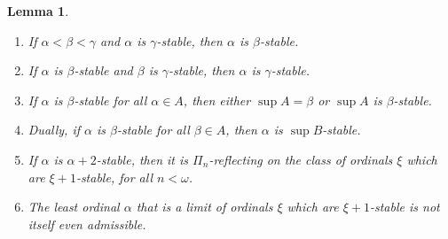 \documentclass{article}
\theoremstyle{definition}
\theoremstyle{plain}
\theoremstyle{plain}
\theoremstyle{plain}
\theoremstyle{plain}
\theoremstyle{remark}
\theoremstyle{remark}
\theoremstyle{remark}
\theoremstyle{plain}
\newtheorem{lemma}[definition]{Lemma}
\theoremstyle{plain}
\theoremstyle{plain}
\begin{document}
\begin{lemma}
\label{StabilityFacts}
\begin{enumerate}
    \item If $\alpha < \beta < \gamma$ and $\alpha$ is $\gamma$-stable, then $\alpha$ is $\beta$-stable.
    \item If $\alpha$ is $\beta$-stable and $\beta$ is $\gamma$-stable, then $\alpha$ is $\gamma$-stable.
    \item If $\alpha$ is $\beta$-stable for all $\alpha \in A$, then either $\sup A = \beta$ or $\sup A$ is $\beta$-stable.
    \item Dually, if $\alpha$ is $\beta$-stable for all $\beta \in A$, then $\alpha$ is $\sup B$-stable.
    \item If $\alpha$ is $\alpha+2$-stable, then it is $\Pi_n$-reflecting on the class of ordinals $\xi$ which are $\xi+1$-stable, for all $n < \omega$.
    \item The least ordinal $\alpha$ that is a limit of ordinals $\xi$ which are $\xi+1$-stable is not itself even admissible.
\end{enumerate}
\end{lemma}
\end{document}

